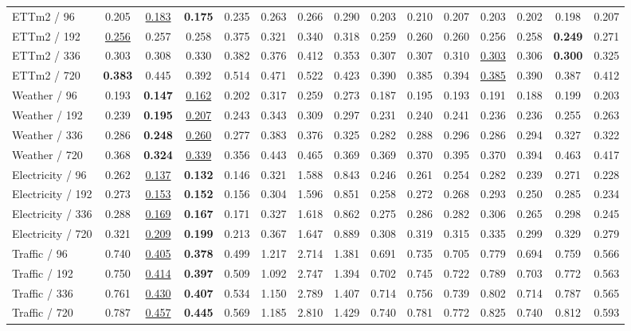 \begin{table}[ht]
{\begin{tabular}{lcccccccccccccc}
ETTm2 / 96 & 0.205 & \underline{0.183} & \textbf{0.175} & 0.235 & 0.263 & 0.266 & 0.290 & 0.203 & 0.210 & 0.207 & 0.203 & 0.202 & 0.198 & 0.207 \\
ETTm2 / 192 & \underline{0.256} & 0.257 & 0.258 & 0.375 & 0.321 & 0.340 & 0.318 & 0.259 & 0.260 & 0.260 & 0.256 & 0.258 & \textbf{0.249} & 0.271 \\
ETTm2 / 336 & 0.303 & 0.308 & 0.330 & 0.382 & 0.376 & 0.412 & 0.353 & 0.307 & 0.307 & 0.310 & \underline{0.303} & 0.306 & \textbf{0.300} & 0.325 \\
ETTm2 / 720 & \textbf{0.383} & 0.445 & 0.392 & 0.514 & 0.471 & 0.522 & 0.423 & 0.390 & 0.385 & 0.394 & \underline{0.385} & 0.390 & 0.387 & 0.412 \\
Weather / 96 & 0.193 & \textbf{0.147} & \underline{0.162} & 0.202 & 0.317 & 0.259 & 0.273 & 0.187 & 0.195 & 0.193 & 0.191 & 0.188 & 0.199 & 0.203 \\
Weather / 192 & 0.239 & \textbf{0.195} & \underline{0.207} & 0.243 & 0.343 & 0.309 & 0.297 & 0.231 & 0.240 & 0.241 & 0.236 & 0.236 & 0.255 & 0.263 \\
Weather / 336 & 0.286 & \textbf{0.248} & \underline{0.260} & 0.277 & 0.383 & 0.376 & 0.325 & 0.282 & 0.288 & 0.296 & 0.286 & 0.294 & 0.327 & 0.322 \\
Weather / 720 & 0.368 & \textbf{0.324} & \underline{0.339} & 0.356 & 0.443 & 0.465 & 0.369 & 0.369 & 0.370 & 0.395 & 0.370 & 0.394 & 0.463 & 0.417 \\
Electricity / 96 & 0.262 & \underline{0.137} & \textbf{0.132} & 0.146 & 0.321 & 1.588 & 0.843 & 0.246 & 0.261 & 0.254 & 0.282 & 0.239 & 0.271 & 0.228 \\
Electricity / 192 & 0.273 & \underline{0.153} & \textbf{0.152} & 0.156 & 0.304 & 1.596 & 0.851 & 0.258 & 0.272 & 0.268 & 0.293 & 0.250 & 0.285 & 0.234 \\
Electricity / 336 & 0.288 & \underline{0.169} & \textbf{0.167} & 0.171 & 0.327 & 1.618 & 0.862 & 0.275 & 0.286 & 0.282 & 0.306 & 0.265 & 0.298 & 0.245 \\
Electricity / 720 & 0.321 & \underline{0.209} & \textbf{0.199} & 0.213 & 0.367 & 1.647 & 0.889 & 0.308 & 0.319 & 0.315 & 0.335 & 0.299 & 0.329 & 0.279 \\
Traffic / 96 & 0.740 & \underline{0.405} & \textbf{0.378} & 0.499 & 1.217 & 2.714 & 1.381 & 0.691 & 0.735 & 0.705 & 0.779 & 0.694 & 0.759 & 0.566 \\
Traffic / 192 & 0.750 & \underline{0.414} & \textbf{0.397} & 0.509 & 1.092 & 2.747 & 1.394 & 0.702 & 0.745 & 0.722 & 0.789 & 0.703 & 0.772 & 0.563 \\
Traffic / 336 & 0.761 & \underline{0.430} & \textbf{0.407} & 0.534 & 1.150 & 2.789 & 1.407 & 0.714 & 0.756 & 0.739 & 0.802 & 0.714 & 0.787 & 0.565 \\
Traffic / 720 & 0.787 & \underline{0.457} & \textbf{0.445} & 0.569 & 1.185 & 2.810 & 1.429 & 0.740 & 0.781 & 0.772 & 0.825 & 0.740 & 0.812 & 0.593 \\
\bottomrule
\end{tabular}}
\end{table}
